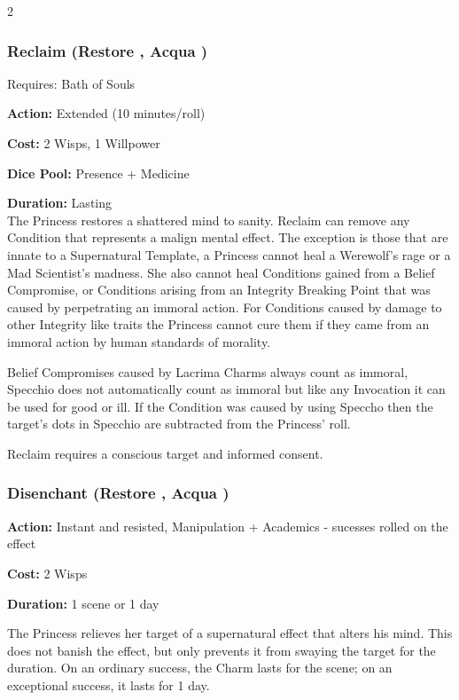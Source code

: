 \begin{multicols}{2}
\subsubsection*{Reclaim (Restore \textbullet\textbullet\textbullet\textbullet, Acqua \textbullet\textbullet\textbullet)}

\noindent Requires: Bath of Souls

\noindent \textbf{Action:} Extended (10 minutes/roll)

\noindent \textbf{Cost:} 2 Wisps, 1 Willpower

\noindent \textbf{Dice Pool:} Presence + Medicine 

\noindent \textbf{Duration:} Lasting \\

\noindent The Princess restores a shattered mind to sanity. Reclaim can remove any Condition that represents a malign mental effect. The exception is those that are innate to a Supernatural Template, a Princess cannot heal a Werewolf's rage or a Mad Scientist's madness. She also cannot heal Conditions gained from a Belief Compromise, or Conditions arising from an Integrity Breaking Point that was caused by perpetrating an immoral action. For Conditions caused by damage to other Integrity like traits the Princess cannot cure them if they came from an immoral action by human standards of morality. 

Belief Compromises caused by Lacrima Charms always count as immoral, Specchio does not automatically count as immoral but like any Invocation it can be used for good or ill. If the Condition was caused by using Speccho then the target's dots in Specchio are subtracted from the Princess' roll.

Reclaim requires a conscious target and informed consent.

\subsubsection*{Disenchant (Restore \textbullet\textbullet\textbullet\textbullet, Acqua \textbullet\textbullet\textbullet\textbullet)}

\noindent \textbf{Action:} Instant and resisted, Manipulation + Academics - sucesses rolled on the effect

\noindent \textbf{Cost:} 2 Wisps

\noindent \textbf{Duration:} 1 scene or 1 day

The Princess relieves her target of a supernatural effect that alters his mind. This does not banish the effect, but only prevents it from swaying the target for the duration. On an ordinary success, the Charm lasts for the scene; on an exceptional success, it lasts for 1 day.


\end{multicols}
